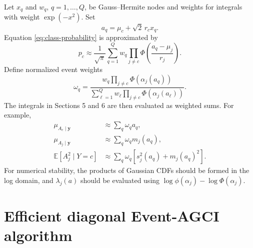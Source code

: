 \documentclass[11pt]{article}
\newcommand{\E}{\mathbb{E}}
\begin{document}
Let $x_q$ and $w_q$, $q=1,\ldots,Q$, be Gauss--Hermite nodes and weights for
integrals with weight $\exp(-x^2)$.  Set
\begin{equation}
 a_q=\mu_c+\sqrt{2}\,r_c x_q.
\end{equation}
Equation \eqref{eq:class-probability} is approximated by
\begin{equation}
 p_c
 \approx
 \frac{1}{\sqrt\pi}
 \sum_{q=1}^{Q}
 w_q
 \prod_{j\ne c}
 \Phi\!\left(
 \frac{a_q-\mu_j}{r_j}
 \right).
 \label{eq:gh-probability}
\end{equation}
Define normalized event weights
\begin{equation}
 \omega_q
 =
 \frac{
 w_q\prod_{j\ne c}\Phi(\alpha_j(a_q))
 }{
 \sum_{\ell=1}^{Q}
 w_\ell\prod_{j\ne c}\Phi(\alpha_j(a_\ell))
 }.
 \label{eq:gh-event-weights}
\end{equation}
The integrals in Sections 5 and 6 are then evaluated as weighted sums.  For
example,
\begin{align}
 \mu_{A_c\mid\bm y}
 &\approx
 \sum_q\omega_qa_q,
 \\
 \mu_{A_j\mid\bm y}
 &\approx
 \sum_q\omega_qm_j(a_q),
 \\
 \E[A_j^2\mid Y=c]
 &\approx
 \sum_q\omega_q\left[s_j^2(a_q)+m_j(a_q)^2\right].
\end{align}
For numerical stability, the products of Gaussian CDFs should be formed in
the log domain, and $\lambda_j(a)$ should be evaluated using
$\log\phi(\alpha_j)-\log\Phi(\alpha_j)$.

\section{Efficient diagonal Event-AGCI algorithm}
\end{document}
